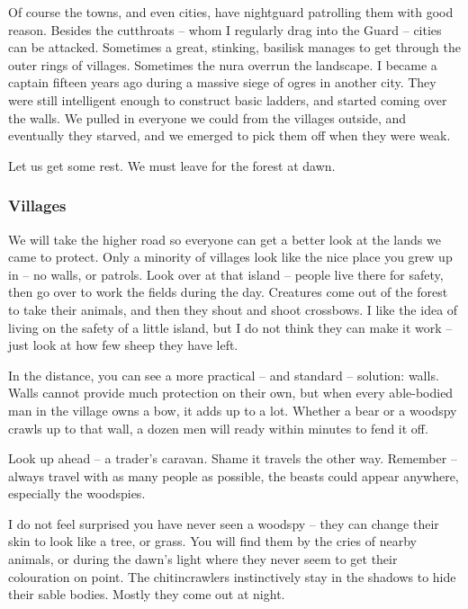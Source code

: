 \begin{multicols}{2}
\begin{exampletext}
	Of course the towns, and even cities, have \gls{nightguard} patrolling them with good reason.
	Besides the cutthroats -- whom I regularly drag into the Guard -- cities can be attacked.
	Sometimes a great, stinking, basilisk manages to get through the outer rings of villages.
	Sometimes the nura overrun the landscape.
	I became a captain fifteen years ago during a massive siege of ogres in another city.
	They were still intelligent enough to construct basic ladders, and started coming over the walls.
	We pulled in everyone we could from the villages outside, and eventually they starved, and we emerged to pick them off when they were weak.

	Let us get some rest.
	We must leave for the forest at dawn.

\end{exampletext}

\subsubsection{Villages}

\begin{exampletext}

	We will take the higher road so everyone can get a better look at the lands we came to protect.
	Only a minority of villages look like the nice place you grew up in -- no walls, or patrols.
	Look over at that island -- people live there for safety, then go over to work the fields during the day.
	Creatures come out of the forest to take their animals, and then they shout and shoot crossbows.
	I like the idea of living on the safety of a little island, but I do not think they can make it work -- just look at how few sheep they have left.

	In the distance, you can see a more practical -- and standard -- solution: walls.
	Walls cannot provide much protection on their own, but when every able-bodied man in the village owns a bow, it adds up to a lot.
	Whether a bear or a woodspy crawls up to that wall, a dozen men will ready within minutes to fend it off.

	Look up ahead -- a trader's caravan.
	Shame it travels the other way.
	Remember -- always travel with as many people as possible, the beasts could appear anywhere, especially the woodspies.

	I do not feel surprised you have never seen a woodspy -- they can change their skin to look like a tree, or grass.
	You will find them by the cries of nearby animals, or during the dawn's light where they never seem to get their colouration on point.
	The chitincrawlers instinctively stay in the shadows to hide their sable bodies.
	Mostly they come out at night.


\end{exampletext}
\end{multicols}
